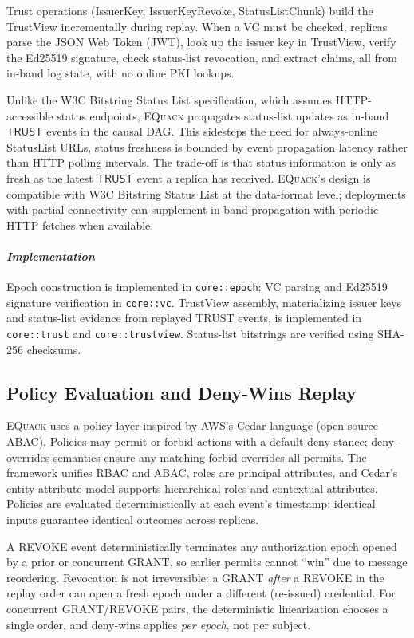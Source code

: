 \documentclass[10pt,journal,compsoc]{IEEEtran}
\newcommand{\equack}{\textsc{EQuack}}
\begin{document}
Trust operations (IssuerKey, IssuerKeyRevoke, StatusListChunk) build the TrustView incrementally during replay. When a VC must be checked, replicas parse the JSON Web Token (JWT), look up the issuer key in TrustView, verify the Ed25519 signature, check status-list revocation, and extract claims, all from in-band log state, with no online PKI lookups.

Unlike the W3C Bitstring Status List specification, which assumes HTTP-accessible status endpoints, \equack{} propagates status-list updates as in-band $\mathsf{TRUST}$ events in the causal DAG. This sidesteps the need for always-online StatusList URLs, status freshness is bounded by event propagation latency rather than HTTP polling intervals. The trade-off is that status information is only as fresh as the latest $\mathsf{TRUST}$ event a replica has received. \equack{}'s design is compatible with W3C Bitstring Status List at the data-format level; deployments with partial connectivity can supplement in-band propagation with periodic HTTP fetches when available.

\paragraph*{\textit{\textbf{Implementation}}} Epoch construction is implemented in \texttt{core::epoch}; VC parsing and Ed25519 signature verification in \texttt{core::vc}. TrustView assembly, materializing issuer keys and status-list evidence from replayed TRUST events, is implemented in \texttt{core::trust} and \texttt{core::trustview}. Status-list bitstrings are verified using SHA-256 checksums.

\subsection{Policy Evaluation and Deny-Wins Replay}

\equack{} uses a policy layer inspired by AWS's Cedar language (open-source ABAC). Policies may permit or forbid actions with a default deny stance; deny-overrides semantics ensure any matching forbid overrides all permits. The framework unifies RBAC and ABAC, roles are principal attributes, and Cedar's entity-attribute model supports hierarchical roles and contextual attributes. Policies are evaluated deterministically at each event's timestamp; identical inputs guarantee identical outcomes across replicas.

A \textsc{REVOKE} event deterministically terminates any authorization epoch opened by a prior or concurrent \textsc{GRANT}, so earlier permits cannot ``win'' due to message reordering. Revocation is not irreversible: a \textsc{GRANT} \emph{after} a \textsc{REVOKE} in the replay order can open a fresh epoch under a different (re-issued) credential. For concurrent \textsc{GRANT}/\textsc{REVOKE} pairs, the deterministic linearization chooses a single order, and deny-wins applies \emph{per epoch}, not per subject.
\end{document}
